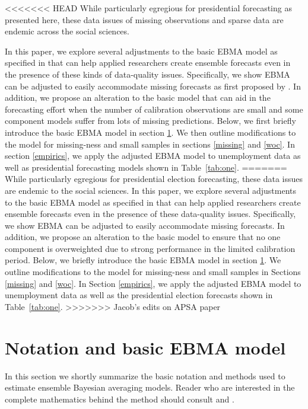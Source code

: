 \documentclass[12pt,fullpage,endnotes]{article}
\begin{document}
<<<<<<< HEAD
While particularly egregious for presidential forecasting as presented here, these data
issues of missing observations and sparse data are endemic across the social sciences.

In this paper, we explore several adjustments to the basic EBMA model
as specified in \citet{mhw:2012} that can help applied
researchers create ensemble forecasts even in the presence of these
kinds of data-quality issues.  Specifically, we show EBMA can be
adjusted to easily accommodate missing forecasts as first proposed by \citep{Fraley:2010}.  In addition, we
propose an alteration to the basic model that can aid in the forecasting effort when the number of calibration observations are small and some component models suffer from lots of missing predictions.  Below, we first briefly introduce
the basic EBMA model in section \ref{model}.  We then outline modifications
to the model for missing-ness and small samples in sections
\ref{missing} and \ref{woc}. In section \ref{empirics}, we apply the
adjusted EBMA model to unemployment data as well as presidential
forecasting models shown in Table~\ref{tab:one}.
=======
While particularly egregious for presidential election forecasting,
these data issues are endemic to the social sciences.  In this paper,
we explore several adjustments to the basic EBMA model as specified in
\citet{mhw:2012} that can help applied researchers create ensemble
forecasts even in the presence of these data-quality issues.
Specifically, we show EBMA can be adjusted to easily accommodate
missing forecasts.  In addition, we propose an alteration to the basic
model to ensure that no one component is overweighted due to strong
performance in the limited calibration period.  Below, we briefly
introduce the basic EBMA model in section \ref{model}.  We outline
modifications to the model for missing-ness and small samples in
Sections \ref{missing} and \ref{woc}. In Section \ref{empirics}, we
apply the adjusted EBMA model to unemployment data as well as the
presidential election forecasts shown in Table~\ref{tab:one}.
>>>>>>> Jacob's edits on APSA paper


\section{Notation and basic EBMA model} 
\label{model}
In this section we shortly summarize the basic notation and methods used to estimate ensemble Bayesian averaging models. Reader who are interested in the complete mathematics behind the method should consult \citet{mhw:2012} and \citet{Raftery:2005}.
\end{document}
